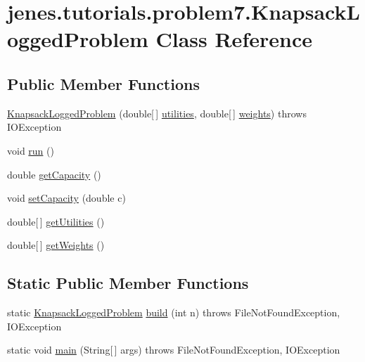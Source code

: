 \hypertarget{classjenes_1_1tutorials_1_1problem7_1_1_knapsack_logged_problem}{\section{jenes.\-tutorials.\-problem7.\-Knapsack\-Logged\-Problem Class Reference}
\label{classjenes_1_1tutorials_1_1problem7_1_1_knapsack_logged_problem}
}
\subsection*{Public Member Functions}
\begin{DoxyCompactItemize}
\item 
\hyperlink{classjenes_1_1tutorials_1_1problem7_1_1_knapsack_logged_problem_a0ab9bce9861fb1a721cb682910fec3dc}{Knapsack\-Logged\-Problem} (double\mbox{[}$\,$\mbox{]} \hyperlink{classjenes_1_1tutorials_1_1problem7_1_1_knapsack_logged_problem_a3c39f1793382e4c16d41caf42a05907d}{utilities}, double\mbox{[}$\,$\mbox{]} \hyperlink{classjenes_1_1tutorials_1_1problem7_1_1_knapsack_logged_problem_ace6faeb8036c0e4ee84fb3ac1426fdd7}{weights})  throws I\-O\-Exception 
\item 
void \hyperlink{classjenes_1_1tutorials_1_1problem7_1_1_knapsack_logged_problem_a433dd1c6435246eec5fdead858ef3237}{run} ()
\item 
double \hyperlink{classjenes_1_1tutorials_1_1problem7_1_1_knapsack_logged_problem_adac9e9311a429d0c41e8d4c9d7a1afb6}{get\-Capacity} ()
\item 
void \hyperlink{classjenes_1_1tutorials_1_1problem7_1_1_knapsack_logged_problem_a7aad6283e4dcd58ee08550a6682c747d}{set\-Capacity} (double c)
\item 
double\mbox{[}$\,$\mbox{]} \hyperlink{classjenes_1_1tutorials_1_1problem7_1_1_knapsack_logged_problem_aa5a5916fe82cdf200e5f9210d673dc35}{get\-Utilities} ()
\item 
double\mbox{[}$\,$\mbox{]} \hyperlink{classjenes_1_1tutorials_1_1problem7_1_1_knapsack_logged_problem_a23b4289088720e543640ae4f1743a129}{get\-Weights} ()
\end{DoxyCompactItemize}
\subsection*{Static Public Member Functions}
\begin{DoxyCompactItemize}
\item 
static \hyperlink{classjenes_1_1tutorials_1_1problem7_1_1_knapsack_logged_problem}{Knapsack\-Logged\-Problem} \hyperlink{classjenes_1_1tutorials_1_1problem7_1_1_knapsack_logged_problem_a541dbb7113b95fa6e579502e847ac36f}{build} (int n)  throws File\-Not\-Found\-Exception, I\-O\-Exception 
\item 
static void \hyperlink{classjenes_1_1tutorials_1_1problem7_1_1_knapsack_logged_problem_ab2896c85405a58a8a2c3474375bf2ac8}{main} (String\mbox{[}$\,$\mbox{]} args)  throws File\-Not\-Found\-Exception, I\-O\-Exception 
\end{DoxyCompactItemize}
